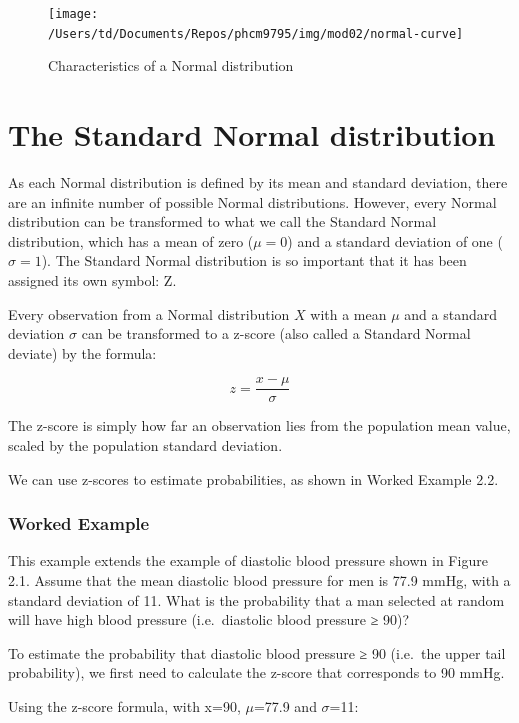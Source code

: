 \documentclass[
]{memoir}
\begin{document}
\begin{figure}
\texttt{[image: /Users/td/Documents/Repos/phcm9795/img/mod02/normal-curve]} \caption{Characteristics of a Normal distribution}\label{fig:fig-2-3}
\end{figure}

\hypertarget{the-standard-normal-distribution}{%
\section{The Standard Normal distribution}\label{the-standard-normal-distribution}}

As each Normal distribution is defined by its mean and standard deviation, there are an infinite number of possible Normal distributions. However, every Normal distribution can be transformed to what we call the Standard Normal distribution, which has a mean of zero (\(\mu = 0\)) and a standard deviation of one (\(\sigma = 1\)). The Standard Normal distribution is so important that it has been assigned its own symbol: Z.

Every observation from a Normal distribution \(X\) with a mean \(\mu\) and a standard deviation \(\sigma\) can be transformed to a z-score (also called a Standard Normal deviate) by the formula:

\[ z = \frac{x - \mu}{\sigma} \]

The z-score is simply how far an observation lies from the population mean value, scaled by the population standard deviation.

We can use z-scores to estimate probabilities, as shown in Worked Example 2.2.

\hypertarget{worked-example-3}{%
\subsubsection{Worked Example}\label{worked-example-3}}

This example extends the example of diastolic blood pressure shown in Figure 2.1. Assume that the mean diastolic blood pressure for men is 77.9 mmHg, with a standard deviation of 11. What is the probability that a man selected at random will have high blood pressure (i.e.~diastolic blood pressure ≥ 90)?

To estimate the probability that diastolic blood pressure ≥ 90 (i.e.~the upper tail probability), we first need to calculate the z-score that corresponds to 90 mmHg.

Using the z-score formula, with x=90, \(\mu\)=77.9 and \(\sigma\)=11:
\end{document}

